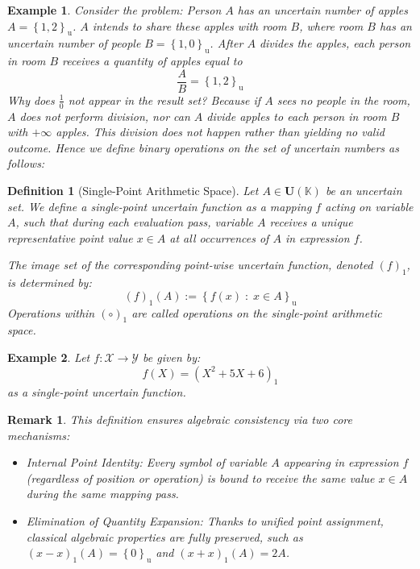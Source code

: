 \documentclass[a4paper,12pt, twoside]{memoir}
\newtheorem{definition}{Definition}[chapter]
\newtheorem{remark}{Remark}[chapter]
\newtheorem{example}{Example}[chapter]
\newcommand{\set}[1]{\left\{#1\right\}} %
\newcommand{\s}[1]{\set{#1}_\mathrm{u}} %
\newcommand{\tsbd}[1]{\mathbf{U}(\mathbb{#1})}
\newcommand{\kgdd}[1]{\left(#1\right)_1} %
\begin{document}
\begin{example}
	Consider the problem: Person $A$ has an uncertain number of apples $A=\s{1,2}$. $A$ intends to share these apples with room $B$, where room $B$ has an uncertain number of people $B = \s{1,0}$. After $A$ divides the apples, each person in room $B$ receives a quantity of apples equal to
	\[\frac{A}{B} = \s{1,2}\]
	Why does $\frac{1}{0}$ not appear in the result set? Because if $A$ sees no people in the room, $A$ does not perform division, nor can $A$ divide apples to each person in room $B$ with $+\infty$ apples. This division does not happen rather than yielding no valid outcome. Hence we define binary operations on the set of uncertain numbers as follows:
\end{example}

\begin{definition}[Single-Point Arithmetic Space]
	Let $A \in \tsbd{K}$ be an uncertain set. We define a single-point uncertain function as a mapping $f$ acting on variable $A$, such that during each evaluation pass, variable $A$ receives a unique representative point value $x \in A$ at all occurrences of $A$ in expression $f$.

	The image set of the corresponding point-wise uncertain function, denoted $\kgdd{f}$, is determined by:
	\[
		\kgdd{f}(A) := \s{f(x) \;:\; x \in A}
	\]
	Operations within $(\circ)_1$ are called operations on the single-point arithmetic space.
\end{definition}

\begin{example}
	Let $f : \mathcal{X} \to \mathcal{Y}$ be given by:
	\[f(X) = (X^2+5X+6)_1\] as a single-point uncertain function.
\end{example}

\begin{remark}
	This definition ensures algebraic consistency via two core mechanisms:
	\begin{itemize}[leftmargin=*]
		\item Internal Point Identity: Every symbol of variable $A$ appearing in expression $f$ (regardless of position or operation) is bound to receive the same value $x \in A$ during the same mapping pass.
		\item Elimination of Quantity Expansion: Thanks to unified point assignment, classical algebraic properties are fully preserved, such as $\kgdd{x - x}(A) = \s{0}$ and $\kgdd{x + x}(A) = 2A$.
	\end{itemize}
\end{remark}
\end{document}
